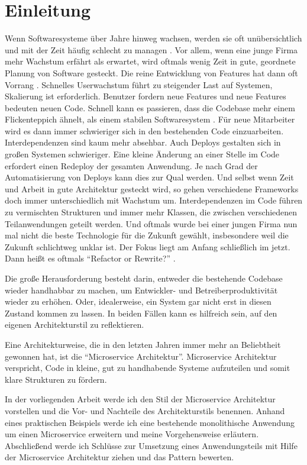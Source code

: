 \chapter{Einleitung}
Wenn Softwaresysteme über Jahre hinweg wachsen, werden sie oft unübersichtlich und mit der Zeit häufig schlecht zu managen \cite{infaktuell}. Vor allem, wenn eine junge Firma mehr Wachstum erfährt als erwartet, wird oftmals wenig Zeit in gute, geordnete Planung von Software gesteckt. Die reine Entwicklung von Features hat dann oft Vorrang \cite{mckinsey}. Schnelles Userwachstum führt zu steigender Last auf Systemen, Skalierung ist erforderlich. Benutzer fordern neue Features und neue Features bedeuten neuen Code. Schnell kann es passieren, dass die Codebase mehr einem Flickenteppich ähnelt, als einem stabilen Softwaresystem \cite[vgl.][Seite 7]{highsmith2013adaptive}. Für neue Mitarbeiter wird es dann immer schwieriger sich in den bestehenden Code einzuarbeiten. Interdependenzen sind kaum mehr absehbar. Auch Deploys gestalten sich in großen Systemen schwieriger. Eine kleine Änderung an einer Stelle im Code erfordert einen Redeploy der gesamten Anwendung. Je nach Grad der Automatisierung von Deploys kann dies zur Qual werden. Und selbst wenn Zeit und Arbeit in gute Architektur gesteckt wird, so gehen verschiedene Frameworks doch immer unterschiedlich mit Wachstum um. Interdependenzen im Code führen zu vermischten Strukturen und immer mehr Klassen, die zwischen verschiedenen Teilanwendungen geteilt werden. Und oftmals wurde bei einer jungen Firma nun mal nicht die beste Technologie für die Zukunft gewählt, insbesondere weil die Zukunft schlichtweg unklar ist. Der Fokus liegt am Anfang schließlich im jetzt. Dann heißt es oftmals \enquote{Refactor or Rewrite?} \cite[vgl.][]{refactorrewrite}.

Die große Herausforderung besteht darin, entweder die bestehende Codebase wieder handhabbar zu machen, um Entwickler- und Betreiberproduktivität wieder zu erhöhen. Oder, idealerweise, ein System gar nicht erst in diesen Zustand kommen zu lassen. In beiden Fällen kann es hilfreich sein, auf den eigenen Architekturstil zu reflektieren.

Eine Architekturweise, die in den letzten Jahren immer mehr an Beliebtheit gewonnen hat, ist die \enquote{Microservice Architektur}. Microservice Architektur verspricht, Code in kleine, gut zu handhabende Systeme aufzuteilen und somit klare Strukturen zu fördern.

In der vorliegenden Arbeit werde ich den Stil der Microservice Architektur vorstellen und die Vor- und Nachteile des Architekturstils benennen. Anhand eines praktischen Beispiels werde ich eine bestehende monolithische Anwendung um einen Microservice erweitern und meine Vorgehensweise erläutern.
Abschließend werde ich Schlüsse zur Umsetzung eines Anwendungsteils mit Hilfe der Microservice Architektur ziehen und das Pattern bewerten.